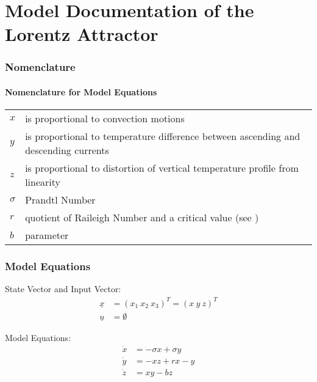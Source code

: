 \documentclass[10pt,a4paper]{article}
\begin{document}
	\part*{Model Documentation of the \\ Lorentz Attractor} %
	
	
	
	
	\section{Nomenclature} %
	\subsection{Nomenclature for Model Equations} %
	
	\begin{tabular}{ll}
		$x$ & is proportional to convection motions \\
		$y$ & is proportional to temperature difference between ascending and descending currents\\
		$z$ & is proportional to distortion of vertical temperature profile from linearity\\
		$\sigma$ & Prandtl Number \\
		$r$ & quotient of Raileigh Number and a critical value (see \cite{LOR63})\\
		$b$ & parameter
	\end{tabular}
	
	
	\section{Model Equations} %
	State Vector and Input Vector:
	\begin{align*}
		\underline{x} &= (x_1 \ x_2 \ x_3)^T = (x \ y \ z )^T \\
		\underline{u} &= \emptyset
	\end{align*}

	\noindent Model Equations:
	\begin{subequations}
	\begin{align}
		\dot{x} &= -\sigma x + \sigma y 	\\      %
		\dot{y} &= -xz + rx - y 	\\
		\dot{z} &= xy - bz	
	\end{align}
	\end{subequations}
\end{document}
